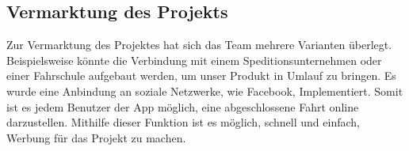 \subsection{Vermarktung des Projekts}

Zur Vermarktung des Projektes hat sich das Team mehrere Varianten überlegt.
\nextline
Beispielsweise könnte die Verbindung mit einem Speditionsunternehmen oder einer Fahrschule aufgebaut werden, um unser Produkt in Umlauf zu bringen.
\nextline
Es wurde eine Anbindung an soziale Netzwerke, wie Facebook, Implementiert. Somit ist es jedem Benutzer der App möglich, eine abgeschlossene Fahrt online darzustellen. Mithilfe dieser Funktion ist es möglich, schnell und einfach, Werbung für das Projekt zu machen.